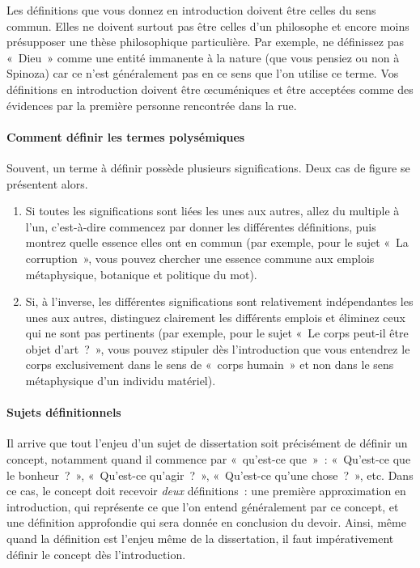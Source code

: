 \documentclass[a4paper]{article}
\begin{document}
Les définitions que vous donnez en introduction doivent être celles du
sens commun. Elles ne doivent surtout pas être celles d'un philosophe et
encore moins présupposer une thèse philosophique particulière. Par
exemple, ne définissez pas « Dieu » comme une entité immanente à la nature
(que vous pensiez ou non à Spinoza) car ce n'est généralement pas en ce
sens que l'on utilise ce terme. Vos définitions en introduction doivent
être œcuméniques et être acceptées comme des évidences par la première
personne rencontrée dans la rue.
\paragraph{Comment définir les termes polysémiques}
\label{sec-2-2-1-4}


Souvent, un terme à définir possède plusieurs significations. Deux cas
de figure se présentent alors. 

\begin{enumerate}
\item Si toutes les significations sont liées les unes aux autres, allez du
   multiple à l'un, c'est-à-dire commencez par donner les différentes
   définitions, puis montrez quelle essence elles ont en commun (par
   exemple, pour le sujet « La corruption », vous pouvez chercher une
   essence commune aux emplois métaphysique, botanique et politique du
   mot).
\item Si, à l'inverse, les différentes significations sont relativement
   indépendantes les unes aux autres, distinguez clairement les
   différents emplois et éliminez ceux qui ne sont pas pertinents (par
   exemple, pour le sujet « Le corps peut-il être objet d'art ? », vous
   pouvez stipuler dès l'introduction que vous entendrez le corps
   exclusivement dans le sens de « corps humain » et non dans le sens
   métaphysique d'un individu matériel).
\end{enumerate}
\paragraph{Sujets définitionnels}
\label{sec-2-2-1-5}


Il arrive que tout l'enjeu d'un sujet de dissertation soit précisément
de définir un concept, notamment quand il commence par « qu'est-ce que » :
« Qu'est-ce que le bonheur ? », « Qu'est-ce qu'agir ? », « Qu'est-ce qu'une
chose ? », etc. Dans ce cas, le concept doit recevoir \emph{deux}
définitions : une première approximation en introduction, qui représente
ce que l'on entend généralement par ce concept, et une définition
approfondie qui sera donnée en conclusion du devoir. Ainsi, même quand
la définition est l'enjeu même de la dissertation, il faut
impérativement définir le concept dès l'introduction.
\end{document}
